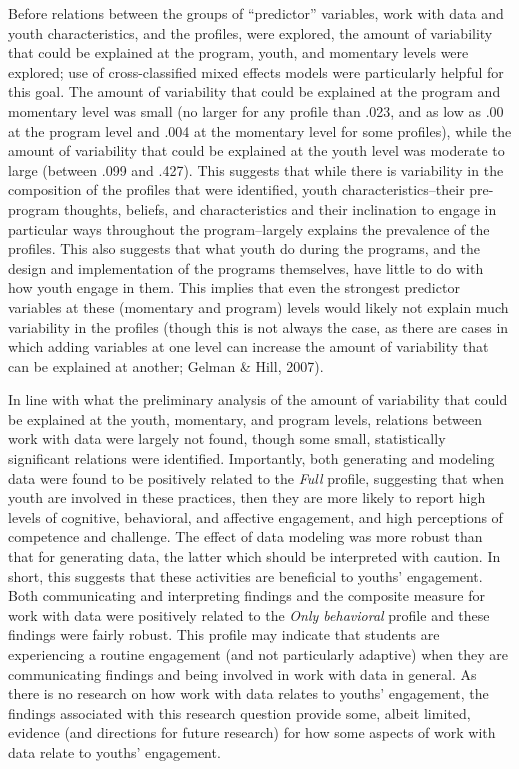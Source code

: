 \documentclass[]{msu-thesis}
\theoremstyle{definition}
\theoremstyle{definition}
\theoremstyle{definition}
\theoremstyle{remark}
\begin{document}
Before relations between the groups of ``predictor'' variables, work
with data and youth characteristics, and the profiles, were explored,
the amount of variability that could be explained at the program, youth,
and momentary levels were explored; use of cross-classified mixed
effects models were particularly helpful for this goal. The amount of
variability that could be explained at the program and momentary level
was small (no larger for any profile than .023, and as low as .00 at the
program level and .004 at the momentary level for some profiles), while
the amount of variability that could be explained at the youth level was
moderate to large (between .099 and .427). This suggests that while
there is variability in the composition of the profiles that were
identified, youth characteristics--their pre-program thoughts, beliefs,
and characteristics and their inclination to engage in particular ways
throughout the program--largely explains the prevalence of the profiles.
This also suggests that what youth do during the programs, and the
design and implementation of the programs themselves, have little to do
with how youth engage in them. This implies that even the strongest
predictor variables at these (momentary and program) levels would likely
not explain much variability in the profiles (though this is not always
the case, as there are cases in which adding variables at one level can
increase the amount of variability that can be explained at another;
Gelman \& Hill, 2007).

In line with what the preliminary analysis of the amount of variability
that could be explained at the youth, momentary, and program levels,
relations between work with data were largely not found, though some
small, statistically significant relations were identified. Importantly,
both generating and modeling data were found to be positively related to
the \emph{Full} profile, suggesting that when youth are involved in
these practices, then they are more likely to report high levels of
cognitive, behavioral, and affective engagement, and high perceptions of
competence and challenge. The effect of data modeling was more robust
than that for generating data, the latter which should be interpreted
with caution. In short, this suggests that these activities are
beneficial to youths' engagement. Both communicating and interpreting
findings and the composite measure for work with data were positively
related to the \emph{Only behavioral} profile and these findings were
fairly robust. This profile may indicate that students are experiencing
a routine engagement (and not particularly adaptive) when they are
communicating findings and being involved in work with data in general.
As there is no research on how work with data relates to youths'
engagement, the findings associated with this research question provide
some, albeit limited, evidence (and directions for future research) for
how some aspects of work with data relate to youths' engagement.
\end{document}
